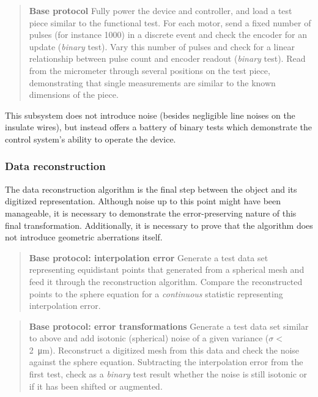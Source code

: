 \documentclass{article}
\begin{document}
\begin{quotation}
  \textbf{Base protocol} Fully power the device and controller, and load   a test piece similar to the functional test. For each motor, send a   fixed number of pulses (for instance 1000) in a discrete event and   check the encoder for an update (\textit{binary} test). Vary this   number of pulses and check for a linear relationship between pulse   count and encoder readout (\textit{binary} test). Read from the   micrometer through several positions on the test piece, demonstrating   that single measurements are similar to the known dimensions of the   piece.
\end{quotation}

This subsystem does not introduce noise (besides negligible line noises on the insulate wires), but instead offers a battery of binary tests which demonstrate the control system's ability to operate the device.

\subsubsection{Data reconstruction}
The data reconstruction algorithm is the final step between the object and its digitized representation. Although noise up to this point might have been manageable, it is necessary to demonstrate the error-preserving nature of this final transformation. Additionally, it is necessary to prove that the algorithm does not introduce geometric aberrations itself.

\begin{quotation}
  \textbf{Base protocol: interpolation error} Generate a test data set   representing equidistant points that generated from a spherical mesh   and feed it through the reconstruction algorithm. Compare the   reconstructed points to the sphere equation for a   \textit{continuous} statistic representing interpolation error.
\end{quotation}

\begin{quotation}
  \textbf{Base protocol: error transformations} Generate a test data   set similar to above and add isotonic (spherical) noise of a given   variance ($\sigma <$ \SI{2}{\micro m}). Reconstruct a digitized mesh   from this data and check the noise against the sphere equation.   Subtracting the interpolation error from the first test, check as a   \textit{binary} test result whether the noise is still isotonic or   if it has been shifted or augmented.
\end{quotation}
\end{document}
